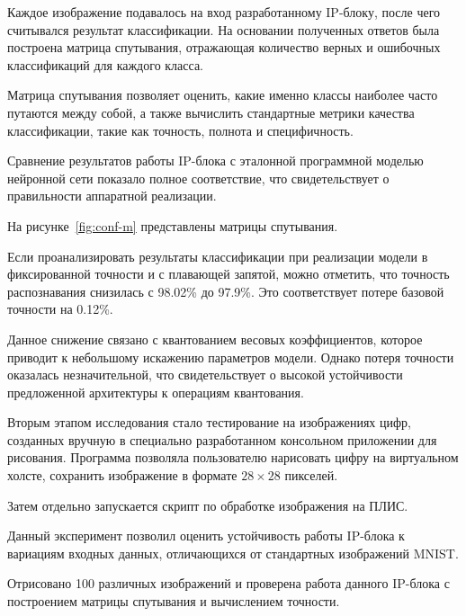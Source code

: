 Каждое изображение подавалось на вход разработанному IP-блоку, после чего 
считывался результат классификации. На основании полученных ответов была 
построена матрица спутывания, отражающая количество верных и ошибочных 
классификаций для каждого класса.

Матрица спутывания позволяет оценить, какие именно классы наиболее часто 
путаются между собой, а также вычислить стандартные метрики качества 
классификации, такие как точность, полнота и 
специфичность.

Сравнение результатов работы IP-блока с эталонной программной моделью нейронной 
сети показало полное соответствие, что свидетельствует о правильности 
аппаратной реализации.

На рисунке~\ref{fig:conf-m} представлены матрицы спутывания.


Если проанализировать результаты классификации при реализации модели в 
фиксированной точности и с плавающей запятой, можно отметить, что точность 
распознавания снизилась с 98.02\% до 97.9\%. Это соответствует потере базовой 
точности на 0.12\%.

Данное снижение связано с квантованием весовых коэффициентов, которое приводит 
к небольшому искажению параметров модели. Однако потеря точности оказалась 
незначительной, что свидетельствует о высокой устойчивости предложенной 
архитектуры к операциям квантования.

\anonsection{}Вторым этапом исследования стало тестирование на изображениях 
цифр, созданных вручную в специально разработанном консольном приложении для 
рисования. Программа позволяла пользователю нарисовать цифру на виртуальном 
холсте, сохранить изображение в формате $28\times28$ пикселей.

Затем отдельно запускается скрипт по обработке изображения на ПЛИС.

Данный эксперимент позволил оценить устойчивость работы IP-блока к вариациям 
входных данных, отличающихся от стандартных изображений MNIST. 

Отрисовано 100 различных изображений и проверена работа данного IP-блока с 
построением матрицы спутывания и вычислением точности.

